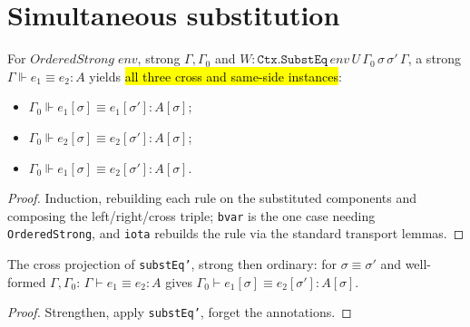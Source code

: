 \section{Simultaneous substitution}

\begin{theorem}
\label{thm:strong-substeq}
\leanok
{}

 For $OrderedStrong\;env$, strong $\Gamma,\Gamma_0$ and
$W:\mathtt{Ctx.SubstEq}\,env\,U\,\Gamma_0\,\sigma\,\sigma'\,\Gamma$, a strong
$\Gamma\Vdash e_1\equiv e_2:A$ yields \hl{all three cross and same-side instances}:
\begin{itemize}
\item $\Gamma_0\Vdash e_1[\sigma]\equiv e_1[\sigma']:A[\sigma]$;
\item $\Gamma_0\Vdash e_2[\sigma]\equiv e_2[\sigma']:A[\sigma]$;
\item $\Gamma_0\Vdash e_1[\sigma]\equiv e_2[\sigma']:A[\sigma]$.
\end{itemize}
\end{theorem}
\begin{proof}
\leanok
{} Induction, rebuilding each rule on the substituted components and composing the
left/right/cross triple; \texttt{bvar} is the one case needing \texttt{OrderedStrong}, and
\texttt{iota} rebuilds the rule via the standard transport lemmas.
\end{proof}

\begin{theorem}
\label{thm:isdefeq-substdf}
\leanok
{}

 The cross projection of \texttt{substEq'}, strong then ordinary: for
$\sigma\equiv\sigma'$ and well-formed $\Gamma,\Gamma_0$: $\Gamma\vdash e_1\equiv e_2:A$ gives
$\Gamma_0\vdash e_1[\sigma]\equiv e_2[\sigma']:A[\sigma]$.
\end{theorem}
\begin{proof}
\leanok
{} Strengthen, apply \texttt{substEq'}, forget the annotations.
\end{proof}

